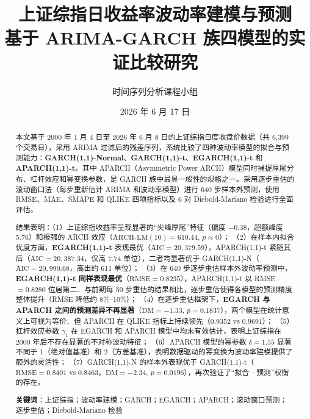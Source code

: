 \documentclass[12pt,a4paper]{article}
\title{\textbf{上证综指日收益率波动率建模与预测}\\[6pt]
        \large 基于 ARIMA-GARCH 族四模型的实证比较研究}
\author{时间序列分析课程小组}
\date{2026 年 6 月 17 日}
\begin{document}
\maketitle

\begin{abstract}
\noindent
本文基于 2000 年 1 月 4 日至 2026 年 6 月 8 日的上证综指日度收盘价数据（共 6{,}399 个交易日），采用 ARIMA 过滤后的残差序列，系统比较了四种波动率模型的拟合与预测能力：\textbf{GARCH(1,1)-Normal}、\textbf{GARCH(1,1)-t}、\textbf{EGARCH(1,1)-t} 和 \textbf{APARCH(1,1)-t}。其中 APARCH（Asymmetric Power ARCH）模型同时捕捉厚尾分布、杠杆效应和幂变换参数，是 GARCH 族中最具一般性的规格之一。采用逐步重估的滚动窗口法（每步重新估计 ARIMA 和波动率模型）进行 640 步样本外预测，使用 RMSE、MAE、SMAPE 和 QLIKE 四项指标以及 6 对 Diebold-Mariano 检验进行全面评估。

结果表明：（1）上证综指收益率呈现显著的``尖峰厚尾''特征（偏度 $-0.38$，超额峰度 5.76）和极强的 ARCH 效应（$\mathrm{ARCH\text{-}LM}(10) = 610.44$, $p \approx 0$）；
（2）在样本内拟合优度方面，\textbf{EGARCH(1,1)-t} 表现最优（$\mathrm{AIC} = 20{,}379.59$），APARCH(1,1)-t 紧随其后（$\mathrm{AIC} = 20{,}387.34$，仅高 7.74 单位），二者均显著优于 GARCH(1,1)-N（$\mathrm{AIC} = 20{,}990.68$，高出约 611 单位）；
（3）在 640 步逐步重估样本外波动率预测中，\textbf{EGARCH(1,1)-t 同样表现最优}（$\mathrm{RMSE}=0.8235$），APARCH(1,1)-t 以 RMSE $=0.8280$ 位居第二．与前期每 50 步重估的结果相比，逐步重估使得各模型的预测精度整体提升（RMSE 降低约 8\%--10\%）；
（4）在逐步重估框架下，\textbf{EGARCH 与 APARCH 之间的预测差异不再显著}（$\mathrm{DM}=-1.33$, $p=0.1837$），两个模型在统计意义上可视为等价．但 APARCH 在 QLIKE 指标上持续领先（$0.9352$ vs $0.9691$）；
（5）杠杆效应参数 $\gamma_1$ 在 EGARCH 和 APARCH 模型中均未有效估计，表明上证综指在 2000 年后不存在显著的不对称波动特征；
（6）APARCH 模型的幂参数 $\delta = 1.55$ 显著不同于 1（绝对值基准）和 2（方差基准），表明数据驱动的幂变换为波动率建模提供了额外的灵活性；
（7）GARCH(1,1)-N 的样本外表现优于 GARCH(1,1)-t（$\mathrm{RMSE}=0.8401$ vs $0.8463$，$\mathrm{DM}=-2.34$, $p=0.0196$），再次验证了``拟合—预测''权衡的存在。

\medskip
\noindent\textbf{关键词}：上证综指；波动率建模；GARCH；EGARCH；APARCH；滚动窗口预测；逐步重估；Diebold-Mariano 检验
\end{abstract}

\end{document}
